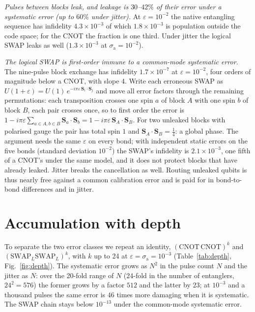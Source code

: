 \documentclass[reprint,aps,pra,amsmath,amssymb,superscriptaddress,letterpaper]{revtex4-2}
\newcommand{\Sv}{\mathbf{S}}
\begin{document}
\emph{Pulses between blocks leak, and leakage is $30$--$42\%$ of their error under a systematic error (up to $60\%$ under jitter).} At $\varepsilon=10^{-2}$ the native entangling sequence has infidelity
$4.3\times10^{-3}$ of which $1.8\times10^{-3}$ is population outside the code
space; for the CNOT the fraction is one third. Under jitter the logical SWAP
leaks as well ($1.3\times10^{-3}$ at $\sigma_{\mathrm a}=10^{-2}$).

\emph{The logical SWAP is first-order immune to a common-mode systematic
error.} The nine-pulse block exchange has infidelity $1.7\times10^{-7}$ at
$\varepsilon=10^{-2}$, four orders of magnitude below a CNOT, with slope 4.
Write each erroneous SWAP as $U(1+\varepsilon)=U(1)\,e^{-i\pi\varepsilon\,\Sv_i\cdot\Sv_j}$
and move all error factors through the remaining permutations: each
transposition crosses one spin $a$ of block $A$ with one spin $b$ of block $B$,
each pair crosses once, so to first order the error is
$1-i\pi\varepsilon\sum_{a\in A,b\in B}\Sv_a\cdot\Sv_b=1-i\pi\varepsilon\,\Sv_A\cdot\Sv_B$.
For two unleaked blocks with polarised gauge the pair has total spin $1$ and
$\Sv_A\cdot\Sv_B=\tfrac14$: a global phase. The argument needs the same
$\varepsilon$ on every bond; with independent static errors on the five bonds
(standard deviation $10^{-2}$) the SWAP's infidelity is $2.1\times10^{-3}$,
one fifth of a CNOT's under the same model, and it does not protect blocks that
have already leaked. Jitter breaks the cancellation as well. Routing unleaked
qubits is thus nearly free against a common calibration error and is paid for
in bond-to-bond differences and in jitter.

\section{Accumulation with depth}
\label{sec:depth}

To separate the two error classes we repeat an identity, $(\mathrm{CNOT}\,
\mathrm{CNOT})^k$ and $(\mathrm{SWAP}_L\mathrm{SWAP}_L)^k$, with $k$ up to 24 at
$\varepsilon=\sigma_{\mathrm a}=10^{-3}$ (Table~\ref{tab:depth},
Fig.~\ref{fig:depth}). The systematic error grows as $N^2$ in the pulse count
$N$ and the jitter as $N$: over the 20-fold range of $N$ (24-fold in the number of entanglers, $24^2=576$) the former grows by a factor $512$ and the latter by $23$; at $10^{-3}$ and a thousand pulses the
same error is $46$ times more damaging when it is systematic. The SWAP chain
stays below $10^{-13}$ under the common-mode systematic error.
\end{document}
